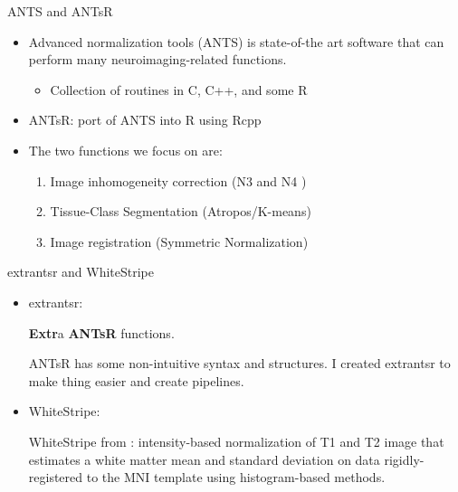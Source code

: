 \documentclass[11pt]{beamer}\usepackage[]{graphicx}\usepackage[]{color}
\begin{document}
\begin{frame}[fragile]{ANTS and ANTsR}

\begin{itemize}
\item Advanced normalization tools (ANTS) \citep{avants2011reproducible} is state-of-the art software that can perform many neuroimaging-related functions.  
  \begin{itemize}
	\item Collection of routines in C, C++, and some R
	\end{itemize}
\item ANTsR: port of ANTS into R using Rcpp
\item The two functions we focus on are: 
\begin{enumerate}
\item Image inhomogeneity correction (N3 \citep{sled1998nonparametric} and N4 \citep{tustison2010n4itk})
\item Tissue-Class Segmentation (Atropos/K-means)
\item Image registration (Symmetric Normalization)
\end{enumerate} 
\end{itemize}

\end{frame}

\begin{frame}[fragile]{extrantsr and WhiteStripe}

\begin{itemize}
\item extrantsr:

{\bf Extr}a {\bf ANTsR} functions.

ANTsR has some non-intuitive syntax and structures.  I created extrantsr to make thing easier and create pipelines. 

\item WhiteStripe:

WhiteStripe from \citet{shinohara2013normalization}:
intensity-based normalization of T1 and T2 image that estimates a white matter mean and standard deviation on data rigidly-registered to the MNI template using histogram-based methods.

\end{itemize}
\end{frame}
\end{document}
